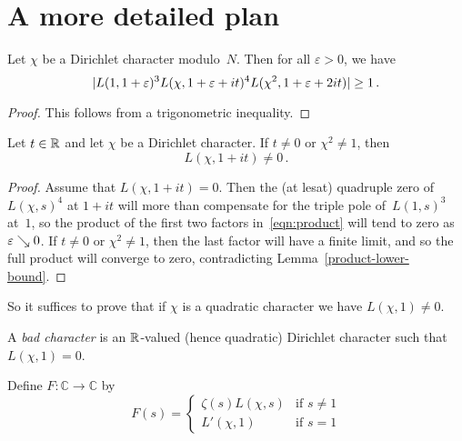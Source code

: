 \section{A more detailed plan}

\begin{lemma} \label{product_lower_bound}
  \leanok
  Let $\chi$ be a Dirichlet character modulo~$N$. Then for all $\varepsilon > 0$, we have
  \begin{equation} \label {eqn:product}
    |L(1, 1 + \varepsilon)^3 L(\chi, 1 + \varepsilon + it)^4 L(\chi^2, 1 + \varepsilon + 2it)| \ge 1 \,.
  \end{equation}
\end{lemma}

\begin{proof}
  \leanok
  This follows from a trigonometric inequality.
\end{proof}

\begin{lemma} \label{non_quadratic}
  Let $t \in \mathbb{R}$ and let $\chi$ be a Dirichlet character. If $t \ne 0$ or $\chi^2 \ne 1$, then
  \[ L(\chi, 1 + it) \ne 0 \,. \]
\end{lemma}

\begin{proof}
  Assume that $L(\chi, 1 + it) = 0$. Then the (at lesat) quadruple zero of~$L(\chi, s)^4$ at $1 + it$
  will more than compensate for the triple pole of~$L(1, s)^3$ at~$1$, so the product of the first
  two factors in~\eqref{eqn:product} will tend to zero as $\varepsilon \searrow 0$.
  If $t \ne 0$ or $\chi^2 \ne 1$, then the last factor will have a finite limit, and so the
  full product will converge to zero, contradicting Lemma~\ref{product-lower-bound}.
\end{proof}


So it suffices to prove that if $\chi$ is a quadratic character we have $L(\chi, 1) \ne 0$.

\begin{definition} \label{def:bad_char}
  \leanok
  A \emph{bad character} is an $\mathbb{R}$-valued (hence quadratic) Dirichlet character such that $L(\chi, 1) = 0$.
\end{definition}

\begin{definition} \label{def:bad_char_F}
  \leanok
  Define $F \colon \mathbb{C} \to \mathbb{C}$ by
  \[ F(s) = \begin{cases}
    \zeta(s) L(\chi, s) & \text{if $s \ne 1$} \\
    L'(\chi, 1) & \text{if $s = 1$}
    \end{cases}
  \]
\end{definition}

